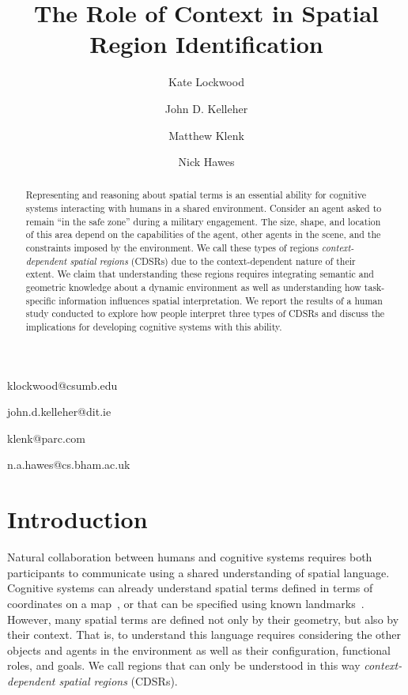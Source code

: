 \documentclass[11pt,letterpaper]{article}
\begin{document}
 

\title{The Role of Context in Spatial Region Identification}
 
\author{Kate Lockwood}{klockwood@csumb.edu}
\address{ITCD Department, California State University - Monterey Bay}
\author{John D. Kelleher}{john.d.kelleher@dit.ie}
\address{Applied Intelligence Research Centre, Dublin Institute of Technology }
\author{Matthew Klenk}{klenk@parc.com}
\address{Palo Alto Research Center, Palo Alto CA }
\author{Nick Hawes}{n.a.hawes@cs.bham.ac.uk}
\address{School of Computer Science, University of Birmingham, UK }
\vskip 0.2in
 
\begin{abstract}
Representing and reasoning about spatial terms is an essential ability for cognitive systems interacting with humans in a shared environment.  Consider an agent asked to remain ``in the safe zone'' during a military engagement.  The size, shape, and location of this area depend on the capabilities of the agent, other agents in the scene, and the constraints imposed by the environment.  We call these types of regions \textit{context-dependent spatial regions} (CDSRs) due to the context-dependent nature of their extent.  We claim that understanding these regions requires integrating semantic and geometric knowledge about a dynamic environment as well as understanding how task-specific information influences spatial interpretation.  We report the results of a human study conducted to explore how people interpret three types of CDSRs and discuss the implications for developing cognitive systems with this ability.
\end{abstract}

\section{Introduction} 
Natural collaboration between humans and cognitive systems requires both participants to communicate using a shared understanding of spatial language.  Cognitive systems can already understand spatial terms defined in terms of coordinates on a map~\cite{Zender2008a}, or that can be specified using known landmarks~\cite{brenneretal07ijcai}.  However, many spatial terms are defined not only by their geometry, but also by their context.  That is, to understand this language requires considering the other objects and agents in the environment as well as their configuration, functional roles, and goals.  We call regions that can only be understood in this way \textit{context-dependent spatial regions} (CDSRs).
\end{document}
